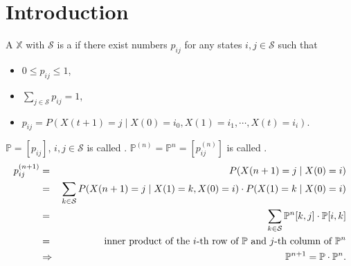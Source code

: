 \section{Introduction}

\begin{definition}
A  $ \mathbb{X} $ with  $ \mathcal{S} $ is a  if there exist numbers $ p_{ij} $ for any states $ i, j \in \mathcal{S} $ such that 
\begin{itemize}
\item $ 0 \le p_{ij} \le 1 $,
\item $ \sum_{j \in \mathcal{S}} p_{ij} = 1 $,
\item $ p_{ij} = P(X(t + 1) = j \mid X(0) = i_{0}, X(1) = i_{1}, \cdots, X(t) = i_{i}). $
\end{itemize}

\begin{comment}
The above conditional probability is independent $ i_{0}, \cdots, i_{t - 1} $, and $ t $. Therefore,
\[ P(X(t + 1) = j \mid X(t) = i) = P(X(t + l + 1) = j \mid X(t + l) = i_{t}). \]
\end{comment}
\end{definition}

\begin{definition}
$ \mathbb{P} = [ p_{ij} ] $, $ i, j \in \mathcal{S} $ is called .
$ \mathbb{P}^{(n)} = \mathbb{P}^{n} = [ p^{(n)}_{ij} ] $ is called .
\begin{eqnarray*}
p^{(n + 1)}_{ij}
  & = & P(X(n + 1) = j \mid X(0) = i) \\
  & = & \sum_{k \in \mathcal{S}} P(X(n + 1) = j \mid X(1) = k, X(0) = i) \cdot P(X(1) = k \mid X(0) = i) \\
  & = & \sum_{k \in \mathcal{S}} \mathbb{P}^{n}[k, j] \cdot \mathbb{P}[i, k] \\
  & = & \text{inner product of the $ i $-th row of $ \mathbb{P} $ and $ j $-th column of $ \mathbb{P}^{n} $} \\
  & \Rightarrow & \mathbb{P}^{n + 1} = \mathbb{P} \cdot \mathbb{P}^{n}.
\end{eqnarray*}
\begin{comment}
There are several properties about a matrix of transition probabilities:
\begin{itemize}
\item $ \mathbb{P} $ models $ \mathbb{X} $,
\item any row summation of $ \mathbb{P} = 1 $,
\item $ 0 \le \text{column summation of }\mathbb{P} \le \text{size of }\mathcal{S} $.
\end{itemize}
\end{comment}
\end{definition}

